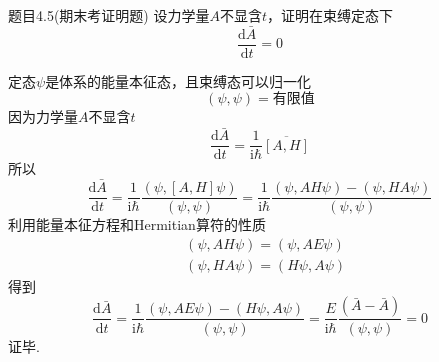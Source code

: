\begin{question}{题目4.5(期末考证明题)}
    设力学量$A$不显含$t$，证明在束缚定态下
    $$
        \frac{\mathrm{d}\bar{A}}{\mathrm{d}t} = 0
    $$
\end{question}
\begin{solution}
    定态$\psi$是体系的能量本征态，且束缚态可以归一化
    $$
        (\psi, \psi) = \text{有限值}
    $$
    因为力学量$A$不显含$t$
    $$
        \frac{\mathrm{d}\bar{A}}{\mathrm{d}t}=\frac{1}{\mathrm{i}\hbar}\overline{[A, H]}
    $$
    所以
    $$
        \frac{\mathrm{d}\bar{A}}{\mathrm{d}t}
        =\frac{1}{\mathrm{i}\hbar}\frac{(\psi, [A,H]\psi)}{(\psi, \psi)}
        =\frac{1}{\mathrm{i}\hbar}\frac{(\psi, AH\psi)-(\psi, HA\psi)}{(\psi, \psi)}
    $$
    利用能量本征方程和Hermitian算符的性质
    $$
        \begin{aligned}
             & (\psi, AH\psi) = (\psi, AE\psi) \\
             & (\psi, HA\psi) = (H\psi, A\psi)
        \end{aligned}
    $$
    得到
    $$
        \frac{\mathrm{d}\bar{A}}{\mathrm{d}t}
        =\frac{1}{\mathrm{i}\hbar}\frac{(\psi, AE\psi)-(H\psi, A\psi)}{(\psi, \psi)}
        =\frac{E}{\mathrm{i}\hbar}\frac{(\bar{A}-\bar{A})}{(\psi, \psi)}
        =0
    $$
    证毕.
\end{solution}






